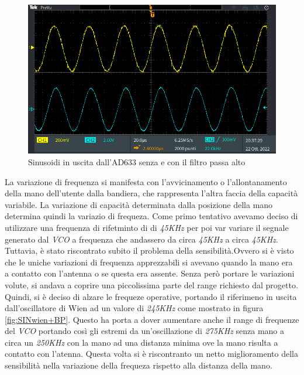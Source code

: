\documentclass[titlepage]{report}
\begin{document}
	 \begin{figure}[H]
		\centering
		\includegraphics[scale = 0.5]{Immagini/sin_ad633+lp4_ad633+lp4+hp1.PNG}
		\caption{Sinusoidi in uscita dall'AD633 senza e con il filtro passa alto}
		\label{fig:AD33+LPconsenzaHP}
	\end{figure}


	La variazione di frequenza si manifesta con l'avvicinamento o l'allontanamento della mano dell'utente dalla bandiera, che rappresenta l'altra faccia della capacità variabile. La variazione di capacità determinata dalla posizione della mano determina quindi la variazio di frequeza. Come primo tentativo avevamo deciso di utilizzare una frequenza di rifetminto di di \textit{45KHz} per poi var variare il segnale generato dal \textit{VCO} a frequenza che andassero da circa \textit{45KHz} a circa \textit{45KHz}.
	Tuttavia, è stato riscontrato subito il problema della sensibilità.Ovvero si è visto che le uniche variazioni di frequenza apprezzabili si avevano quando la mano era a contatto con l'antenna o se questa era assente. Senza però portare le variazioni volute, si andava a coprire una piccolissima parte del range richiesto dal progetto.
	Quindi, si è deciso di alzare le frequeze operative, portando il riferimeno in uscita dall'oscillatore di Wien ad un valore di \textit{245KHz} come mostrato in figura \ref{fig:SINwien+BP}. Questo ha porta a dover aumentare anche il range di frequenze del \textit{VCO} portando così gli estremi da un'oscillazione di \textit{275KHz} senza mano a circa un \textit{250KHz} con la mano ad una distanza minima ove la mano risulta a contatto con l'atenna.
	Questa volta si è riscontranto un netto miglioramento della sensibilità nella variazione della frequeza rispetto alla distanza della mano.
	
\end{document}
